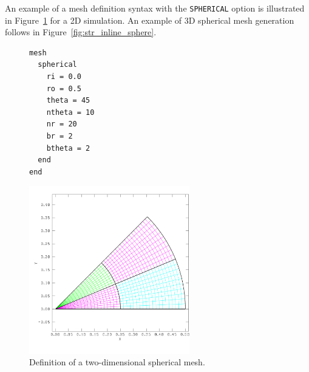 
An example of a mesh definition syntax with the
\texttt{SPHERICAL} option is illustrated in
Figure~\ref{fig:test_radial} for a 2D simulation.  An example of 3D
spherical mesh generation follows in
Figure~\ref{fig:str_inline_sphere}.

\begin{figure}[htb]
  \centering
  \begin{minipage}[c]{0.4\linewidth}
    \centering
{\ttfamily \begin{verbatim}
mesh
  spherical
    ri = 0.0
    ro = 0.5
    theta = 45
    ntheta = 10
    nr = 20
    br = 2
    btheta = 2
  end
end
\end{verbatim}}
  \end{minipage}%
  \hfil
  \begin{minipage}[c]{0.6\linewidth}
    \centering
      \includegraphics[width=2.75in]{figures/test_radial}
  \end{minipage}
  \caption{Definition of a two-dimensional spherical mesh.}
  \label{fig:test_radial}
\end{figure}


